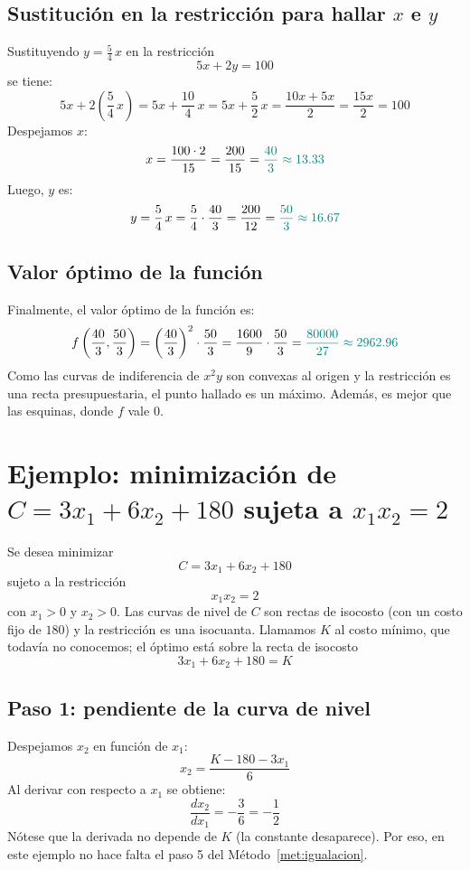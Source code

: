 \documentclass{article}
\begin{document}
\subsection*{Sustitución en la restricción para hallar \(x\) e \(y\)}
 
Sustituyendo \(y=\frac{5}{4}\,x\) en la restricción
\[
5x+2y=100
\]
se tiene:
\[
5x+2\left(\frac{5}{4}\,x\right)=5x+\frac{10}{4}\,x=5x+\frac{5}{2}\,x=\frac{10x+5x}{2}=\frac{15x}{2}=100
\]
Despejamos \(x\):
\[
x=\frac{100\cdot 2}{15}=\frac{200}{15}=\color{teal}\frac{40}{3}\approx 13.33
\]
Luego, \(y\) es:
\[
y=\frac{5}{4}\,x=\frac{5}{4}\cdot\frac{40}{3}=\frac{200}{12}=\color{teal}\frac{50}{3}\approx 16.67
\]
 
\subsection*{Valor óptimo de la función}
 
Finalmente, el valor óptimo de la función es:
\[
f\left(\frac{40}{3},\frac{50}{3}\right)=\left(\frac{40}{3}\right)^2\cdot\frac{50}{3}=\frac{1600}{9}\cdot\frac{50}{3}=\color{teal}\frac{80000}{27}\approx 2962.96
\]
Como las curvas de indiferencia de \(x^2y\) son convexas al origen y la restricción es una recta presupuestaria, el punto hallado es un máximo. Además, es mejor que las esquinas, donde \(f\) vale \(0\).
 
 
\section*{Ejemplo: minimización de \(C = 3x_1 + 6x_2 + 180\) sujeta a \(x_1 x_2 = 2\)}
 
Se desea minimizar
\[
C = 3x_1 + 6x_2 + 180
\]
sujeto a la restricción
\[
x_1 x_2 = 2
\]
con \(x_1>0\) y \(x_2>0\). Las curvas de nivel de \(C\) son rectas de isocosto (con un costo fijo de \(180\)) y la restricción es una isocuanta. Llamamos \(K\) al costo mínimo, que todavía no conocemos; el óptimo está sobre la recta de isocosto
\[
3x_1 + 6x_2 +180 = K
\]
 
\subsection*{Paso 1: pendiente de la curva de nivel}
Despejamos \(x_2\) en función de \(x_1\):
\[
x_2 = \frac{K - 180 - 3x_1}{6}
\]
Al derivar con respecto a \(x_1\) se obtiene:
\[
\frac{dx_2}{dx_1} = -\frac{3}{6} = -\frac{1}{2}
\]
Nótese que la derivada no depende de \(K\) (la constante desaparece). Por eso, en este ejemplo no hace falta el paso 5 del Método~\ref{met:igualacion}.
 
\end{document}
